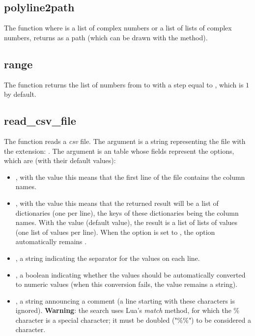 \subsection{polyline2path}

The function  where  is a list of complex numbers or a list of lists of complex numbers, returns  as a path (which can be drawn with the  method).

\subsection{range}

The function  returns the list of numbers from  to  with a step equal to , which is $1$ by default.


\subsection{read\_csv\_file}

The function  reads a \emph{csv} file. The argument  is a string representing the file with the extension: . The argument  is an table whose fields represent the options, which are (with their default values):
\begin{itemize}
    \item {}, with the value \true this means that the first line of the file contains the column names.

    \item {}, with the value \true this means that the returned result will be a list of dictionaries (one per line), the keys of these dictionaries being the column names. With the value \false (default value), the result is a list of lists of values ​​(one list of values ​​per line). When the  option is set to \false, the  option automatically remains \false.

    \item {}, a string indicating the separator for the values ​​on each line.
    
    \item {}, a boolean indicating whether the values ​​should be automatically converted to numeric values ​​(when this conversion fails, the value remains a string).
    
    \item {}, a string announcing a comment (a line starting with these characters is ignored). \textbf{Warning}: the search uses Lua's \emph{match} method, for which the \% character is a special character; it must be doubled ("\%\%") to be considered a character.
\end{itemize}

